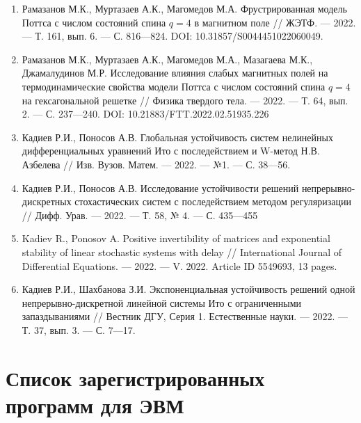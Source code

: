 \begin{enumerate}[1]
    \item
    Рамазанов М.К., Муртазаев А.К., Магомедов М.А.
    Фрустрированная модель Поттса с числом состояний спина $q = 4$ в магнитном поле
    //
    ЖЭТФ.
    --- 2022.
    --- Т. 161, вып. 6.
    --- С. 816---824. DOI: 10.31857/S0044451022060049.
    
    \item
    Рамазанов М.К., Муртазаев А.К., Магомедов М.А., Мазагаева М.К., Джамалудинов М.Р.
    Исследование влияния слабых магнитных полей на термодинамические свойства модели Поттса с числом состояний спина $q = 4$ на гексагональной решетке
    //
    Физика твердого тела. 
    --- 2022.
    --- Т. 64, вып. 2.
    --- С. 237---240. DOI: 10.21883/FTT.2022.02.51935.226


    
    \item
    Кадиев Р.И., Поносов А.В.
    Глобальная устойчивость систем нелинейных дифференциальных уравнений Ито с последействием и W-метод Н.В. Азбелева
    //
    Изв. Вузов. Матем.
    --- 2022.
    --- №1.
    --- С. 38---56. 
    
    \item
    Кадиев Р.И., Поносов А.В.
    Исследование устойчивости решений непрерывно-дискретных стохастических систем с последействием методом регуляризации
    //
    Дифф. Урав.
    --- 2022.
    --- Т. 58, № 4.
    --- С. 435---455 
    
    \item
    Kadiev R., Ponosov A.
    Positive invertibility of matrices and exponential stability of linear stochastic systems with delay
    //
    International Journal of Differential Equations.
    --- 2022.
    --- V. 2022. 
    Article ID 5549693, 13 pages.
    
    \item
    Кадиев Р.И., Шахбанова З.И.
    Экспоненциальная устойчивость решений одной непрерывно-дискретной линейной системы Ито с ограниченными запаздываниями
    //
    Вестник ДГУ, Серия 1. Естественные науки.
    --- 2022.
    --- Т. 37, вып. 3.
    --- С. 7---17. 

\end{enumerate}

\section*{Список зарегистрированных программ для ЭВМ}

